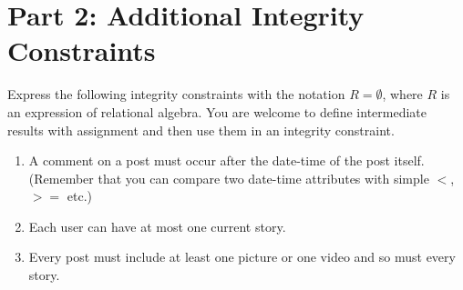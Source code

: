 \documentclass{article}
\begin{document}
\section*{Part 2: Additional Integrity Constraints}


Express the following integrity constraints
with the notation $R = \emptyset$, where $R$ is an expression of relational algebra. 
You are welcome to define intermediate results with assignment
and then use them in an integrity constraint.

\begin{enumerate}

\item   %
A comment on a post must occur after the date-time of the post itself.
(Remember that you can compare two date-time attributes with simple $<$,
$>=$ etc.)

\item %
Each user can have at most one current story.

\item %
Every post must include at least one picture or one video and so must every story.

\end{enumerate}
\end{document}
